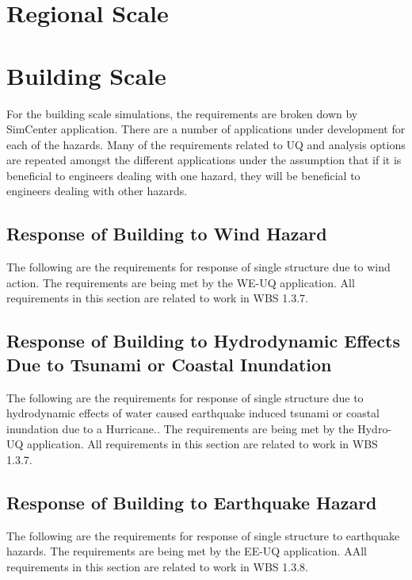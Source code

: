 \documentclass{simcenterdocumentation}
\begin{document}
\section{Regional Scale}


\clearpage
\section{Building Scale}

For the building scale simulations, the requirements are broken down by SimCenter application. There are a number of applications under development for each of the hazards. Many of the requirements related to UQ and analysis options are repeated amongst the different applications under the assumption that if it is beneficial to engineers dealing with one hazard, they will be beneficial to engineers dealing with other hazards.

\subsection{Response of Building to Wind Hazard}
The following are the requirements for response of single structure due to wind action. The requirements are being met by the WE-UQ application. All requirements in this section are related to work in WBS 1.3.7.

 
 
 \clearpage
 \subsection{Response of Building to Hydrodynamic Effects Due to Tsunami or Coastal Inundation}
The following are the requirements for response of single structure due to hydrodynamic effects of water caused earthquake induced tsunami or coastal inundation due to a Hurricane.. The requirements are being met by the Hydro-UQ application. All requirements in this section are related to work in WBS 1.3.7.

 
 

\clearpage
\subsection{Response of Building to Earthquake Hazard}
The following are the requirements for response of single structure to earthquake hazards. The requirements are being met by the EE-UQ application. AAll requirements in this section are related to work in WBS 1.3.8.
\end{document}
